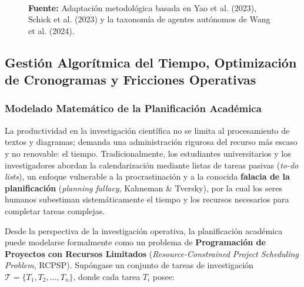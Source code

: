 \begin{figure}[htpb!]
\begin{tcolorbox}[colback=white, colframe=unmsm_gold, arc=3pt, boxrule=0.8pt, top=0.3cm, bottom=0.3cm, left=0.4cm, right=0.4cm]
{%
}\\[0.25cm]
\raggedright
{\scriptsize \textbf{Fuente:} Adaptación metodológica basada en Yao et al. (2023), Schick et al. (2023) y la taxonomía de agentes autónomos de Wang et al. (2024).\par}
\end{tcolorbox}
\end{figure}

\subsection{Gestión Algorítmica del Tiempo, Optimización de Cronogramas y Fricciones Operativas}

\subsubsection{Modelado Matemático de la Planificación Académica}

La productividad en la investigación científica no se limita al procesamiento de textos y diagramas; demanda una administración rigurosa del recurso más escaso y no renovable: el tiempo. Tradicionalmente, los estudiantes universitarios y los investigadores abordan la calendarización mediante listas de tareas pasivas (\textit{to-do lists}), un enfoque vulnerable a la procrastinación y a la conocida \textbf{falacia de la planificación} (\textit{planning fallacy}, Kahneman \& Tversky), por la cual los seres humanos subestiman sistemáticamente el tiempo y los recursos necesarios para completar tareas complejas.

Desde la perspectiva de la investigación operativa, la planificación académica puede modelarse formalmente como un problema de \textbf{Programación de Proyectos con Recursos Limitados} (\textit{Resource-Constrained Project Scheduling Problem}, RCPSP). Supóngase un conjunto de tareas de investigación $\mathcal{T} = \{T_1, T_2, \dots, T_n\}$, donde cada tarea $T_i$ posee:


